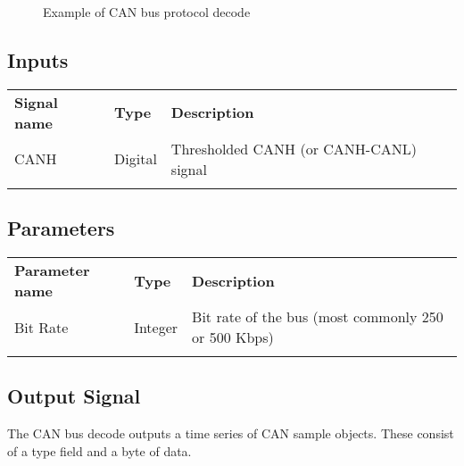 \begin{figure}[h]
\centering
{}
\caption{Example of CAN bus protocol decode}
\label{filter_can}
\end{figure}

\subsection{Inputs}

\begin{tabularx}{16cm}{llX}
\thickhline
\textbf{Signal name} & \textbf{Type} & \textbf{Description} \\
\thickhline
CANH & Digital & Thresholded CANH (or CANH-CANL) signal \\
\thickhline
\end{tabularx}

\subsection{Parameters}

\begin{tabularx}{16cm}{llX}
\thickhline
\textbf{Parameter name} & \textbf{Type} & \textbf{Description} \\
\thickhline
Bit Rate & Integer & Bit rate of the bus (most commonly 250 or 500 Kbps)\\
\thickhline
\end{tabularx}

\subsection{Output Signal}

The CAN bus decode outputs a time series of CAN sample objects. These consist of a type field and a byte of data.

